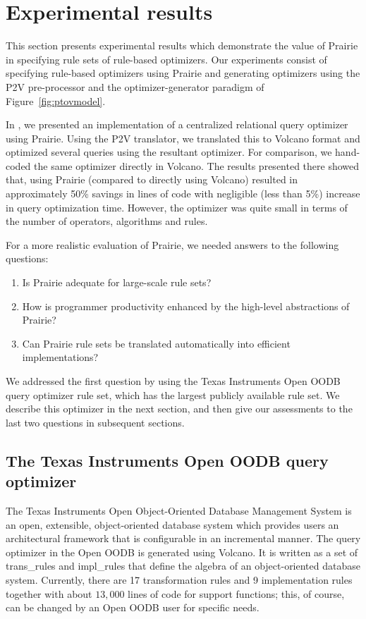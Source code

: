 \section{Experimental results}
\label{sec:results}

This section presents experimental results which demonstrate the value
of Prairie in specifying rule sets of rule-based optimizers.  Our
experiments consist of specifying rule-based optimizers using Prairie
and generating optimizers using the P2V pre-processor and the
optimizer-generator paradigm of Figure~\ref{fig:ptovmodel}.

In \cite{Das93}, we presented an implementation of a centralized
relational query optimizer using Prairie.  Using the P2V translator, we
translated this to Volcano format and optimized several queries using
the resultant optimizer.  For comparison, we hand-coded the same
optimizer directly in Volcano.  The results presented there showed
that, using Prairie (compared to directly using Volcano) resulted in
approximately 50\% savings in lines of code with negligible (less than
5\%) increase in query optimization time.  However, the optimizer was
quite small in terms of the number of operators, algorithms and rules.

For a more realistic evaluation of Prairie, we needed answers to
the following questions:
\begin{enumerate}
\item Is Prairie adequate for large-scale rule sets?
\item How is programmer productivity enhanced by the high-level
      abstractions of Prairie?
\item Can Prairie rule sets be translated automatically into
      efficient implementations?
\end{enumerate}

We addressed the first question by using the Texas Instruments Open
OODB query optimizer rule set, which has the largest publicly
available rule set.  We describe this optimizer in the next section,
and then give our assessments to the last two questions in subsequent
sections.

\subsection{The Texas Instruments Open OODB query optimizer}
\label{sec:oodb}

The Texas Instruments Open Object-Oriented Database Management System
is an open, extensible, object-oriented database system which provides
users an architectural framework that is configurable in an incremental
manner.  The query optimizer in the Open OODB \cite{Blak93} is
generated using Volcano.  It is written as a set of trans\_rules and
impl\_rules that define the algebra of an object-oriented database
system.  Currently, there are 17 transformation rules and 9
implementation rules together with about $13,000$ lines of code for
support functions; this, of course, can be changed by an Open OODB user
for specific needs.

